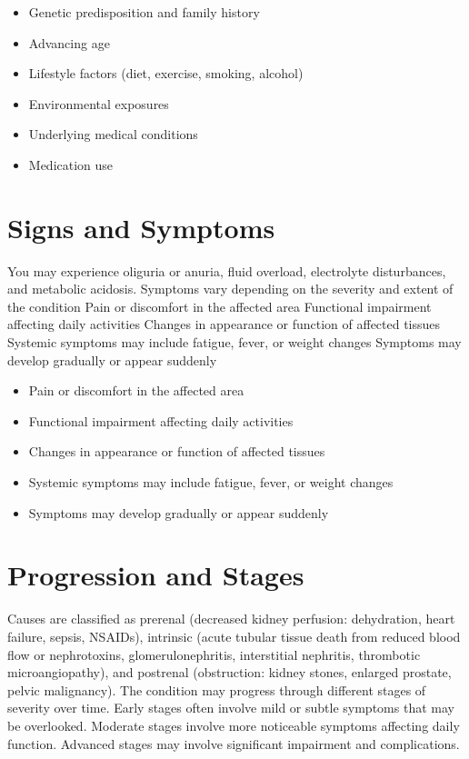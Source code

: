 \begin{itemize}[noitemsep]
  \item Genetic predisposition and family history
  \item Advancing age
  \item Lifestyle factors (diet, exercise, smoking, alcohol)
  \item Environmental exposures
  \item Underlying medical conditions
  \item Medication use
\end{itemize}
\section{Signs and Symptoms}
You may experience oliguria or anuria, fluid overload, electrolyte disturbances, and metabolic acidosis. Symptoms vary depending on the severity and extent of the condition Pain or discomfort in the affected area Functional impairment affecting daily activities Changes in appearance or function of affected tissues Systemic symptoms may include fatigue, fever, or weight changes Symptoms may develop gradually or appear suddenly

\begin{itemize}[noitemsep]
  \item Pain or discomfort in the affected area
  \item Functional impairment affecting daily activities
  \item Changes in appearance or function of affected tissues
  \item Systemic symptoms may include fatigue, fever, or weight changes
  \item Symptoms may develop gradually or appear suddenly
\end{itemize}
\section{Progression and Stages}
Causes are classified as prerenal (decreased kidney perfusion: dehydration, heart failure, sepsis, NSAIDs), intrinsic (acute tubular tissue death from reduced blood flow or nephrotoxins, glomerulonephritis, interstitial nephritis, thrombotic microangiopathy), and postrenal (obstruction: kidney stones, enlarged prostate, pelvic malignancy). The condition may progress through different stages of severity over time. Early stages often involve mild or subtle symptoms that may be overlooked. Moderate stages involve more noticeable symptoms affecting daily function. Advanced stages may involve significant impairment and complications.
